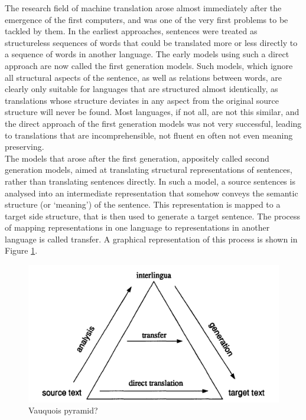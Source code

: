 \documentclass{report}
\theoremstyle{definition}
\theoremstyle{plain}
\begin{document}
The research field of machine translation arose almost immediately after the emergence of the first computers, and was one of the very first problems to be tackled by them. In the earliest approaches, sentences were treated as structureless sequences of words that could be translated more or less directly to a sequence of words in another language. The early models using such a direct approach are now called the first generation models. Such models, which ignore all structural aspects of the sentence, as well as relations between words, are clearly only suitable for languages that are structured almost identically, as translations whose structure deviates in any aspect from the original source structure will never be found. Most languages, if not all, are not this similar, and the direct approach of the first generation models was not very successful, leading to translations that are incomprehensible, not fluent en often not even meaning preserving.\\
The models that arose after the first generation, appositely called second generation models, aimed at translating structural representations of sentences, rather than translating sentences directly. In such a model, a source sentences is analysed into an intermediate representation that somehow conveys the semantic structure (or `meaning') of the sentence. This representation is mapped to a target side structure, that is then used to generate a target sentence. The process of mapping representations in one language to representations in another language is called transfer. A graphical representation of this process is shown in Figure \ref{fig:triangle}. 

\begin{figure}[!ht]
\includegraphics[scale=0.2]{translation_triangle.png}
\caption{Vauquois pyramid?}\label{fig:triangle}
\end{figure}
\end{document}
